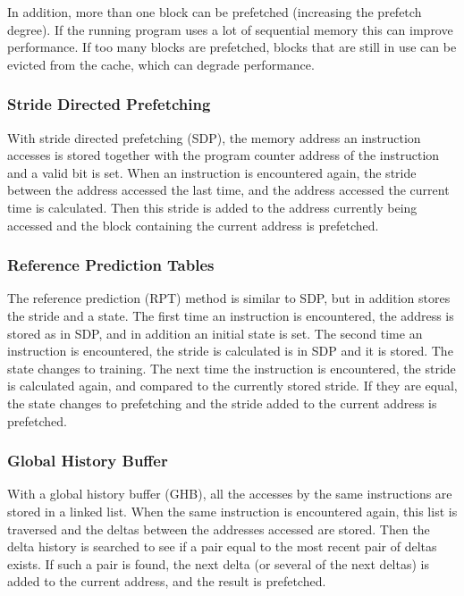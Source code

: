 In addition, more than one block can be prefetched (increasing the
prefetch degree). If the running program uses a lot of sequential
memory this can improve performance. If too many blocks are
prefetched, blocks that are still in use can be evicted from the
cache, which can degrade performance.

\subsubsection{Stride Directed Prefetching}

With stride directed prefetching (SDP), the memory address an instruction
accesses is stored together with the program counter address of the instruction
and a valid bit is set. When an instruction is encountered again, the stride
between the address accessed the last time, and the address accessed the
current time is calculated. Then this stride is added to the address currently
being accessed and the block containing the current address is prefetched.

\subsubsection{Reference Prediction Tables}

The reference prediction (RPT) method is similar to SDP, but in
addition stores the stride and a state. The first time an
instruction is encountered, the address is stored as in SDP, and
in addition an initial state is set. The second time an instruction
is encountered, the stride is calculated is in SDP and it is stored.
The state changes to training. The next time the instruction is
encountered, the stride is calculated again, and compared to the
currently stored stride. If they are equal, the state changes to
prefetching and the stride added to the current address is
prefetched.

\subsubsection{Global History Buffer}

With a global history buffer (GHB), all the accesses by the same
instructions are stored in a linked list. When the same
instruction is encountered again, this list is traversed and the
deltas between the addresses accessed are stored. Then the delta
history is searched to see if a pair equal to the most recent pair
of deltas exists. If such a pair is found, the next delta (or
several of the next deltas) is added to the current address,
and the result is prefetched.


